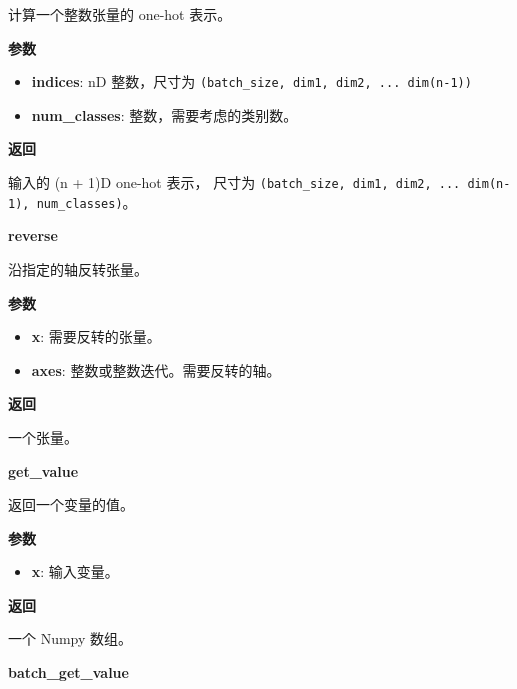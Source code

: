计算一个整数张量的 one-hot 表示。

\textbf{参数}

\begin{itemize}
\tightlist
\item
  \textbf{indices}: nD 整数，尺寸为
  \texttt{(batch\_size,\ dim1,\ dim2,\ ...\ dim(n-1))}
\item
  \textbf{num\_classes}: 整数，需要考虑的类别数。
\end{itemize}

\textbf{返回}

输入的 (n + 1)D one-hot 表示， 尺寸为
\texttt{(batch\_size,\ dim1,\ dim2,\ ...\ dim(n-1),\ num\_classes)}。


\textbf{reverse}\label{reverse}

\begin{Shaded}
\begin{Highlighting}[]
\end{Highlighting}
\end{Shaded}

沿指定的轴反转张量。

\textbf{参数}

\begin{itemize}
\tightlist
\item
  \textbf{x}: 需要反转的张量。
\item
  \textbf{axes}: 整数或整数迭代。需要反转的轴。
\end{itemize}

\textbf{返回}

一个张量。


\textbf{get\_value}\label{getux5fvalue}

\begin{Shaded}
\begin{Highlighting}[]
\end{Highlighting}
\end{Shaded}

返回一个变量的值。

\textbf{参数}

\begin{itemize}
\tightlist
\item
  \textbf{x}: 输入变量。
\end{itemize}

\textbf{返回}

一个 Numpy 数组。


\textbf{batch\_get\_value}\label{batchux5fgetux5fvalue}

